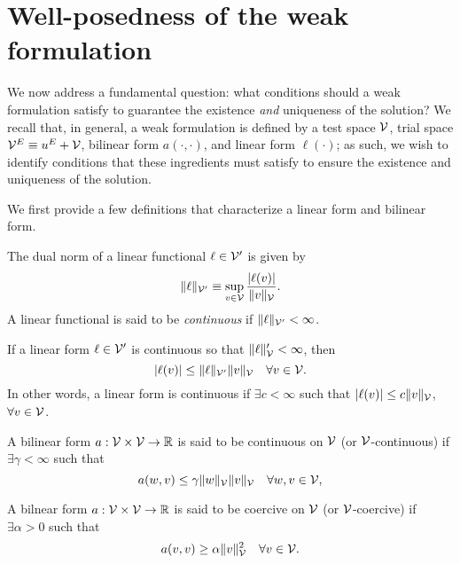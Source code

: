 \section{Well-posedness of the weak formulation}
\label{sec:var_wellposedness}
We now address a fundamental question: what conditions should a weak formulation satisfy to guarantee the existence \emph{and} uniqueness of the solution?  We recall that, in general, a weak formulation is defined by a test space $\mathcal{V}$, trial space $\mathcal{V}^E \equiv u^E + \mathcal{V}$, bilinear form $a(\cdot,\cdot)$, and linear form $\ell(\cdot)$; as such, we wish to identify conditions that these ingredients must satisfy to ensure the existence and uniqueness of the solution.

We first provide a few definitions that characterize a linear form and bilinear form.
\begin{definition}
  The dual norm of a linear functional $\ell \in \mathcal{V}'$ is given by
  \begin{equation*}
    \| \ell \|_{\mathcal{V}'} \equiv \sup_{v \in \mathcal{V}} \frac{|\ell(v)|}{\| v \|_{\mathcal{V}}}.
  \end{equation*}
  A linear functional is said to be \emph{continuous} if $\| \ell \|_{\mathcal{V}'} < \infty$.
\end{definition}
\begin{corollary}
  If a linear form $\ell \in \mathcal{V}'$ is continuous so that $\| \ell \|_{\mathcal{V}}' < \infty$, then
  \begin{equation*}
    |\ell(v)| \leq \| \ell \|_{\mathcal{V}'} \| v \|_{\mathcal{V}} \quad \forall v \in \mathcal{V}.
  \end{equation*}
  In other words, a linear form is continuous if $\exists c < \infty$ such that $| \ell(v) | \leq c \| v \|_{\mathcal{V}}$, $\forall v \in \mathcal{V}$.
\end{corollary}
\begin{definition}[continuity]
  \label{def:th_continuity}
  A bilinear form $a: \mathcal{V} \times \mathcal{V} \to \mathbb{R}$ is said to be continuous on $\mathcal{V}$ (or $\mathcal{V}$-continuous) if $\exists \gamma < \infty$ such that 
  \begin{equation*}
    a(w,v) \leq \gamma \| w \|_{\mathcal{V}} \| v \|_{\mathcal{V}} \quad \forall w,v \in \mathcal{V},
  \end{equation*}
\end{definition}
\begin{definition}[coercivity]
  \label{def:th_coercivity}
  A bilnear form $a: \mathcal{V} \times \mathcal{V} \to \mathbb{R}$ is said to be coercive on $\mathcal{V}$ (or $\mathcal{V}$-coercive) if $\exists \alpha > 0$ such that 
  \begin{equation*}
    a(v,v) \geq \alpha \| v \|_{\mathcal{V}}^2 \quad \forall v \in \mathcal{V}.
  \end{equation*}
\end{definition}
